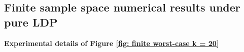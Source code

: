 \documentclass[accepted]{article}
\theoremstyle{plain} %
\theoremstyle{definition}
\theoremstyle{remark}
\newcommand{\eps}{\varepsilon}
\newcommand{\HG}[1]{\textcolor{cyan}{[#1]}}
\begin{document}

\subsection{Finite sample space numerical results under pure LDP}\label{appendix: finite space}

\textbf{Experimental details of Figure \ref{fig: finite worst-case k = 20}}
\end{document}
